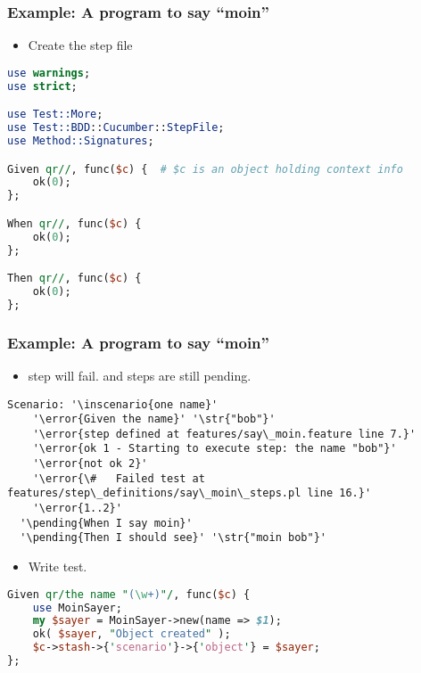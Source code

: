 \documentclass[10pt]{vcs_beamer}
\newcommand{\pending}[1]{\color{DarkOrange}{#1}}
\newcommand{\inscenario}[1]{\color{RoyalBlue}{#1}}
\newcommand{\str}[1]{\color{Turquoise}{#1}}
\newcommand{\error}[1]{\color{red}{#1}}
\begin{document}
\begin{frame}[fragile]
\frametitle{Example: A program to say ``moin''}

\begin{itemize}
    \item Create the step file
\end{itemize}

\begin{lstlisting}[language=perl]
use warnings;
use strict;

use Test::More;
use Test::BDD::Cucumber::StepFile;
use Method::Signatures;

Given qr//, func($c) {  # $c is an object holding context info
    ok(0);
};

When qr//, func($c) {
    ok(0);
};

Then qr//, func($c) {
    ok(0);
};
\end{lstlisting}

\end{frame}

\begin{frame}[fragile]
\frametitle{Example: A program to say ``moin''}

\begin{itemize}
    \item {} step will fail.   and  steps are
        still pending.
\end{itemize}

\begin{lstlisting}[escapeinside='']
Scenario: '\inscenario{one name}'
    '\error{Given the name}' '\str{"bob"}'
    '\error{step defined at features/say\_moin.feature line 7.}'
    '\error{ok 1 - Starting to execute step: the name "bob"}'
    '\error{not ok 2}'
    '\error{\#   Failed test at features/step\_definitions/say\_moin\_steps.pl line 16.}'
    '\error{1..2}'
  '\pending{When I say moin}'
  '\pending{Then I should see}' '\str{"moin bob"}'
\end{lstlisting}

\begin{itemize}
    \item Write  test.
\end{itemize}

\begin{lstlisting}[language=perl]
Given qr/the name "(\w+)"/, func($c) {
    use MoinSayer;
    my $sayer = MoinSayer->new(name => $1);
    ok( $sayer, "Object created" );
    $c->stash->{'scenario'}->{'object'} = $sayer;
};
\end{lstlisting}

\end{frame}
\end{document}
